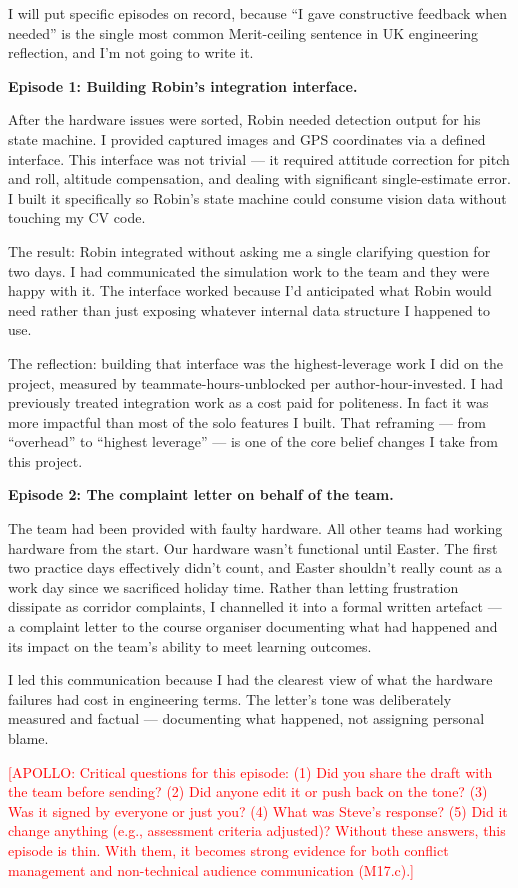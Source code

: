 I will put specific episodes on record, because ``I gave constructive feedback when needed'' is the single most common Merit-ceiling sentence in UK engineering reflection, and I'm not going to write it.

\textbf{Episode 1: Building Robin's integration interface.}

After the hardware issues were sorted, Robin needed detection output for his state machine. I provided captured images and GPS coordinates via a defined interface. This interface was not trivial --- it required attitude correction for pitch and roll, altitude compensation, and dealing with significant single-estimate error. I built it specifically so Robin's state machine could consume vision data without touching my CV code.

The result: Robin integrated without asking me a single clarifying question for two days. I had communicated the simulation work to the team and they were happy with it. The interface worked because I'd anticipated what Robin would need rather than just exposing whatever internal data structure I happened to use.

The reflection: building that interface was the highest-leverage work I did on the project, measured by teammate-hours-unblocked per author-hour-invested. I had previously treated integration work as a cost paid for politeness. In fact it was more impactful than most of the solo features I built. That reframing --- from ``overhead'' to ``highest leverage'' --- is one of the core belief changes I take from this project.

\textbf{Episode 2: The complaint letter on behalf of the team.}

The team had been provided with faulty hardware. All other teams had working hardware from the start. Our hardware wasn't functional until Easter. The first two practice days effectively didn't count, and Easter shouldn't really count as a work day since we sacrificed holiday time. Rather than letting frustration dissipate as corridor complaints, I channelled it into a formal written artefact --- a complaint letter to the course organiser documenting what had happened and its impact on the team's ability to meet learning outcomes.

I led this communication because I had the clearest view of what the hardware failures had cost in engineering terms. The letter's tone was deliberately measured and factual --- documenting what happened, not assigning personal blame.

\textcolor{red}{[APOLLO: Critical questions for this episode: (1) Did you share the draft with the team before sending? (2) Did anyone edit it or push back on the tone? (3) Was it signed by everyone or just you? (4) What was Steve's response? (5) Did it change anything (e.g., assessment criteria adjusted)? Without these answers, this episode is thin. With them, it becomes strong evidence for both conflict management and non-technical audience communication (M17.c).]}

